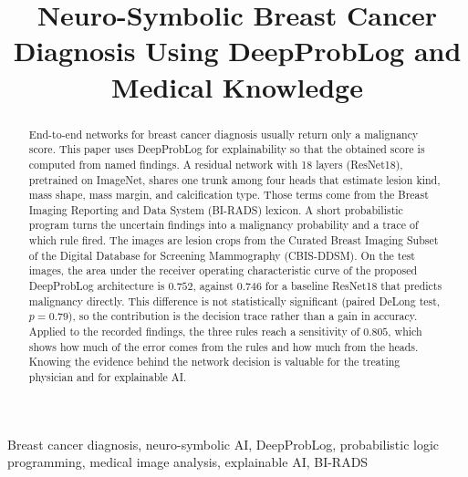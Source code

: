 \documentclass[conference]{IEEEtran}
\newcommand{\rev}[1]{\textcolor{revcolor}{#1}}
\begin{document}
\title{Neuro-Symbolic Breast Cancer Diagnosis Using DeepProbLog and Medical Knowledge}



\maketitle

\begin{abstract}
End-to-end networks for breast cancer diagnosis usually return only a malignancy score. This paper uses DeepProbLog for explainability so that the obtained score is computed from named findings. A residual network with 18 layers (ResNet18), pretrained on ImageNet, shares one trunk among four heads that estimate lesion kind, mass shape, mass margin, and calcification type. Those terms come from the Breast Imaging Reporting and Data System (BI-RADS) lexicon. A short probabilistic program turns the uncertain findings into a malignancy probability and a trace of which rule fired. The images are lesion crops from the Curated Breast Imaging Subset of the Digital Database for Screening Mammography (CBIS-DDSM). On the test images, the area under the receiver operating characteristic curve of the proposed DeepProbLog architecture is $0.752$, against $0.746$ for a baseline ResNet18 that predicts malignancy directly. \rev{This difference is not statistically significant (paired DeLong test, $p=0.79$), so the contribution is the decision trace rather than a gain in accuracy. Applied to the recorded findings, the three rules reach a sensitivity of $0.805$, which shows how much of the error comes from the rules and how much from the heads. Knowing the evidence behind the network decision is valuable for the treating physician and for explainable AI.}
\end{abstract}

\begin{IEEEkeywords}
Breast cancer diagnosis, neuro-symbolic AI, DeepProbLog, probabilistic logic programming, medical image analysis, explainable AI, BI-RADS
\end{IEEEkeywords}










\end{document}
